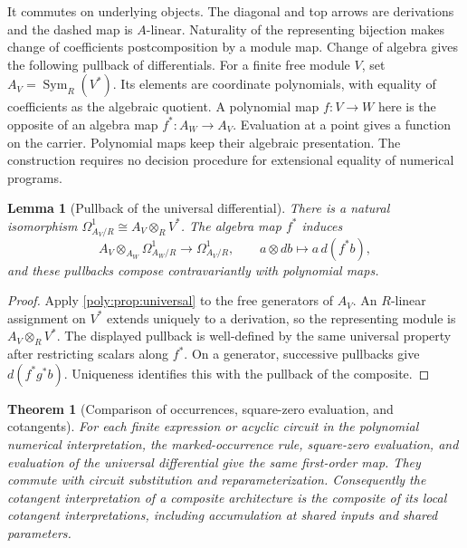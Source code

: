 \documentclass[11pt,a4paper]{article}
\newtheorem{theorem}{Theorem}[section]
\newtheorem{lemma}[lemma]{Lemma}
\theoremstyle{definition}
\theoremstyle{remark}\newaliascnt{remark}{theorem}
\newcommand{\Sym}{\operatorname{Sym}}
\numberwithin{equation}{section}
\begin{document}
It commutes on underlying objects. The diagonal and top arrows are derivations and the dashed map is \(A\)-linear. Naturality of the representing bijection makes change of coefficients postcomposition by a module map. Change of algebra gives the following pullback of differentials.
For a finite free module \(V\), set \(A_V=\Sym_R(V^*)\). Its elements are coordinate polynomials, with equality of coefficients as the algebraic quotient. A polynomial map \(f:V\to W\) here is the opposite of an algebra map \(f^*:A_W\to A_V\). Evaluation at a point gives a function on the carrier. Polynomial maps keep their algebraic presentation. The construction requires no decision procedure for extensional equality of numerical programs.
\begin{lemma}[Pullback of the universal differential]\label{neural:lem:kahler}
There is a natural isomorphism $\Omega^1_{A_V/R}\cong A_V\otimes_R V^*$. The algebra map $f^*$ induces
\[
 A_V\otimes_{A_W}\Omega^1_{A_W/R}\longrightarrow\Omega^1_{A_V/R},
 \qquad a\otimes db\longmapsto a\,d(f^*b),
\]
and these pullbacks compose contravariantly with polynomial maps.
\end{lemma}
\begin{proof}
Apply \cref{poly:prop:universal} to the free generators of
$A_V$. An $R$-linear assignment on $V^*$ extends uniquely to a
derivation, so the representing module is $A_V\otimes_RV^*$.
The displayed pullback is well-defined by the same universal property
after restricting scalars along $f^*$. On a generator, successive
pullbacks give $d(f^*g^*b)$. Uniqueness identifies this with the
pullback of the composite.
\end{proof}
\begin{theorem}[Comparison of occurrences, square-zero evaluation, and cotangents]
\label{poly:thm:differential-comparison}
For each finite expression or acyclic circuit in the polynomial
numerical interpretation, the marked-occurrence rule, square-zero evaluation, and evaluation of
the universal differential give the same first-order map. They commute
with circuit substitution and reparameterization. Consequently the
cotangent interpretation of a composite architecture is the composite
of its local cotangent interpretations, including accumulation at
shared inputs and shared parameters.
\end{theorem}
\end{document}
